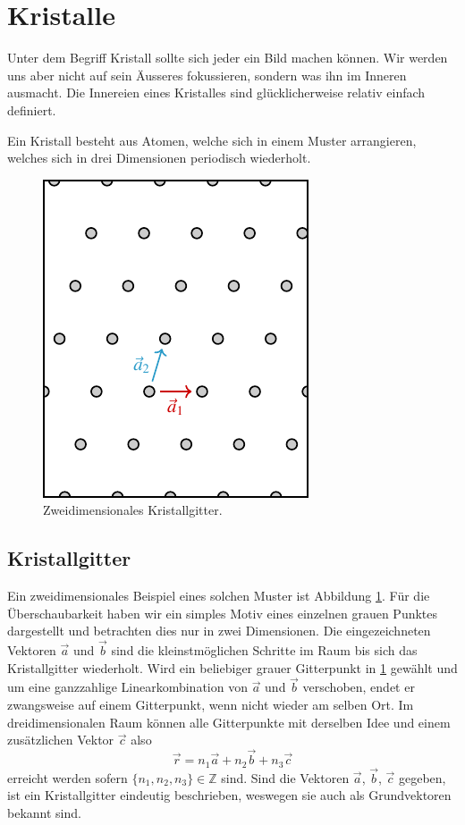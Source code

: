 \section{Kristalle}
Unter dem Begriff Kristall sollte sich jeder ein Bild machen können.
Wir werden uns aber nicht auf sein Äusseres fokussieren, sondern was ihn im Inneren ausmacht.
Die Innereien eines Kristalles sind glücklicherweise relativ einfach definiert.
\begin{definition}[Kristall]
    Ein Kristall besteht aus Atomen, welche sich in einem Muster arrangieren, welches sich in drei Dimensionen periodisch wiederholt.
\end{definition}

\begin{figure}
    \centering
    \includegraphics[]{papers/punktgruppen/figures/lattice}
    \caption{
        Zweidimensionales Kristallgitter.
        \label{fig:punktgruppen:lattice}
    }
\end{figure}
\subsection{Kristallgitter}
Ein zweidimensionales Beispiel eines solchen Muster ist Abbildung \ref{fig:punktgruppen:lattice}.
Für die Überschaubarkeit haben wir ein simples Motiv eines einzelnen grauen Punktes dargestellt und betrachten dies nur in zwei Dimensionen.
Die eingezeichneten Vektoren \(\vec{a}\) und \(\vec{b}\) sind die kleinstmöglichen Schritte im Raum bis sich das Kristallgitter wiederholt.
Wird ein beliebiger grauer Gitterpunkt in \ref{fig:punktgruppen:lattice} gewählt und um eine ganzzahlige Linearkombination von \(\vec{a}\) und \(\vec{b}\) verschoben, endet er zwangsweise auf einem Gitterpunkt, wenn nicht wieder am selben Ort.
Im dreidimensionalen Raum können alle Gitterpunkte mit derselben Idee und einem zusätzlichen Vektor \(\vec{c}\) also
\[
    \vec{r} = n_1 \vec{a} + n_2 \vec{b} + n_3 \vec{c}
\]
erreicht werden sofern \(\{n_1,n_2,n_3\} \in \mathbb{Z}\) sind.
Sind die Vektoren  \(\vec{a}\), \(\vec{b}\), \(\vec{c}\) gegeben, ist ein Kristallgitter eindeutig beschrieben, weswegen sie auch als Grundvektoren bekannt sind.

